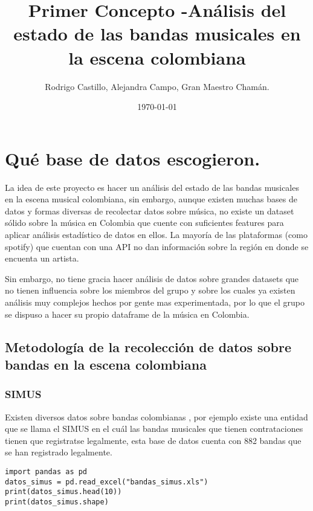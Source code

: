 \documentclass[11pt]{article}
\author{Rodrigo Castillo, Alejandra Campo, Gran Maestro Chamán.}
\date{\today}
\title{Primer Concepto -Análisis del estado de las bandas musicales en la escena colombiana}
\begin{document}
\maketitle
\tableofcontents



\section{Qué base de datos escogieron.}
\label{sec:orgfe3c9e9}
La idea de este proyecto es hacer un análisis del estado de las bandas musicales
en la escena musical colombiana, sin embargo, aunque existen muchas bases de
datos y formas diversas
de recolectar datos sobre música, no existe un dataset sólido sobre la música en
Colombia que cuente con suficientes features para aplicar análisis estadístico
de datos en ellos. La mayoría de las plataformas (como spotify) que cuentan con
una API no dan información sobre la región en donde se encuenta un artista.

Sin embargo, no tiene gracia hacer análisis de datos sobre grandes datasets que
no tienen influencia sobre los miembros del grupo y sobre los cuales ya existen
análisis muy complejos hechos por gente mas experimentada, por lo que el grupo
se dispuso a hacer su propio dataframe de la música en Colombia.

\subsection{Metodología de la recolección de datos sobre bandas en la escena colombiana}
\label{sec:orgbe7e7ce}
\subsubsection{SIMUS}
\label{sec:org2d391ae}
Existen diversos datos sobre bandas colombianas , por ejemplo existe una entidad que se llama el SIMUS en el cuál las bandas musicales que tienen contrataciones tienen que registratse legalmente, esta base de datos cuenta con 882 bandas que se han registrado legalmente.
\begin{verbatim}
import pandas as pd
datos_simus = pd.read_excel("bandas_simus.xls")
print(datos_simus.head(10))
print(datos_simus.shape)
\end{verbatim}
\end{document}
